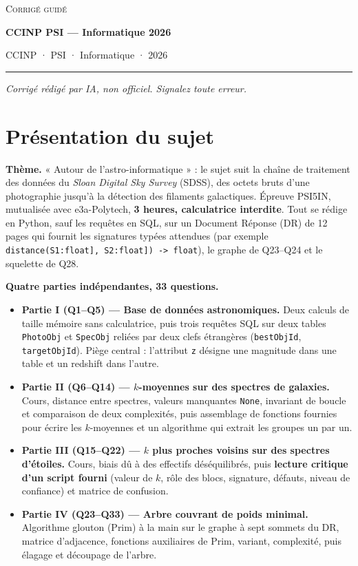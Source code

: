 \documentclass[11pt,a4paper]{article}
\providecommand{\tightlist}{\setlength{\itemsep}{0pt}\setlength{\parskip}{0pt}}
\begin{document}
\thispagestyle{plain}
\begin{center}
  {\small\scshape Corrigé guidé}\par\smallskip
  {\LARGE\bfseries CCINP PSI — Informatique 2026\par}\medskip
  {\large CCINP · PSI · Informatique · 2026\par}
\end{center}
\vspace{2pt}\hrule\vspace{8pt}

\emph{Corrigé rédigé par IA, non officiel. Signalez toute erreur.}

\hypertarget{pruxe9sentation-du-sujet}{%
\section{Présentation du sujet}\label{pruxe9sentation-du-sujet}}

\textbf{Thème.} « Autour de l'astro-informatique » : le sujet suit la chaîne de traitement des données du \emph{Sloan Digital Sky Survey} (SDSS), des octets bruts d'une photographie jusqu'à la détection des filaments galactiques. Épreuve PSI5IN, mutualisée avec e3a-Polytech, \textbf{3 heures, calculatrice interdite}. Tout se rédige en Python, sauf les requêtes en SQL, sur un Document Réponse (DR) de 12 pages qui fournit les signatures typées attendues (par exemple \texttt{distance(\allowbreak{}S1:\allowbreak{}{[}float{]}\allowbreak{},\allowbreak{}\ S2:\allowbreak{}{[}float{]}\allowbreak{})\allowbreak{}\ -\textgreater{}\ float}), le graphe de Q23--Q24 et le squelette de Q28.

\textbf{Quatre parties indépendantes, 33 questions.}

\begin{itemize}
\tightlist
\item
  \textbf{Partie I (Q1--Q5) --- Base de données astronomiques.} Deux calculs de taille mémoire sans calculatrice, puis trois requêtes SQL sur deux tables \texttt{PhotoObj} et \texttt{SpecObj} reliées par deux clefs étrangères (\texttt{bestObjId}, \texttt{targetObjId}). Piège central : l'attribut \texttt{z} désigne une magnitude dans une table et un redshift dans l'autre.
\item
  \textbf{Partie II (Q6--Q14) --- \(k\)-moyennes sur des spectres de galaxies.} Cours, distance entre spectres, valeurs manquantes \texttt{None}, invariant de boucle et comparaison de deux complexités, puis assemblage de fonctions fournies pour écrire les \(k\)-moyennes et un algorithme qui extrait les groupes un par un.
\item
  \textbf{Partie III (Q15--Q22) --- \(k\) plus proches voisins sur des spectres d'étoiles.} Cours, biais dû à des effectifs déséquilibrés, puis \textbf{lecture critique d'un script fourni} (valeur de \(k\), rôle des blocs, signature, défauts, niveau de confiance) et matrice de confusion.
\item
  \textbf{Partie IV (Q23--Q33) --- Arbre couvrant de poids minimal.} Algorithme glouton (Prim) à la main sur le graphe à sept sommets du DR, matrice d'adjacence, fonctions auxiliaires de Prim, variant, complexité, puis élagage et découpage de l'arbre.
\end{itemize}
\end{document}
